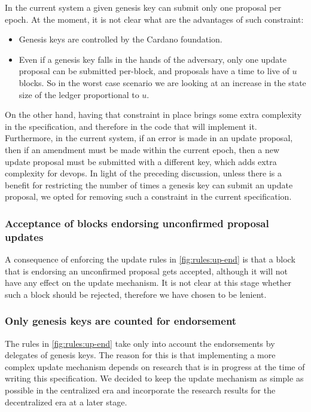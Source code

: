 In the current system a given genesis key can submit only one proposal per
epoch. At the moment, it is not clear what are the advantages of such
constraint:
\begin{itemize}
\item Genesis keys are controlled by the Cardano foundation.
\item Even if a genesis key falls in the hands of the adversary, only one
  update proposal can be submitted per-block, and proposals have a time to live of $u$ blocks. So in the worst case scenario we are looking at an
  increase in the state size of the ledger proportional to $u$.
\end{itemize}
On the other hand, having that constraint in place brings some extra complexity
in the specification, and therefore in the code that will implement it.
Furthermore, in the current system, if an error is made in an update proposal,
then if an amendment must be made within the current epoch, then a new update
proposal must be submitted with a different key, which adds extra complexity
for devops. In light of the preceding discussion, unless there is a benefit for
restricting the number of times a genesis key can submit an update proposal, we
opted for removing such a constraint in the current specification.

\subsubsection{Acceptance of blocks endorsing unconfirmed proposal updates}
\label{sec:acceptance-of-uncofirmed-up-endorsements}

A consequence of enforcing the update rules in \cref{fig:rules:up-end} is that
a block that is endorsing an unconfirmed proposal gets accepted, although it
will not have any effect on the update mechanism. It is not clear at this stage
whether such a block should be rejected, therefore we have chosen to be lenient.

\subsubsection{Only genesis keys are counted for endorsement}
\label{sec:only-genesis-keys-count-for-endorsement}

The rules in \cref{fig:rules:up-end} take only into account the endorsements by
delegates of genesis keys. The reason for this is that implementing a more
complex update mechanism depends on research that is in progress at the time of
writing this specification. We decided to keep the update mechanism as simple
as possible in the centralized era and incorporate the research results for the
decentralized era at a later stage.
